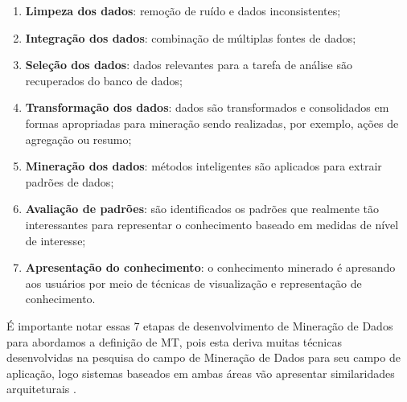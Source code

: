     \begin{enumerate}
        \item \textbf{Limpeza dos dados}: remoção de ruído e dados inconsistentes;
        \item \textbf{Integração dos dados}: combinação de múltiplas fontes de dados;
        \item \textbf{Seleção dos dados}: dados relevantes para a tarefa de análise são recuperados do banco de dados;
        \item \textbf{Transformação dos dados}: dados são transformados e consolidados em formas apropriadas para mineração sendo realizadas, por exemplo, ações de agregação ou resumo;
        \item \textbf{Mineração dos dados}: métodos inteligentes são aplicados para extrair padrões de dados;
        \item \textbf{Avaliação de padrões}: são identificados os padrões que realmente tão interessantes para representar o conhecimento baseado em medidas de nível de interesse;
        \item \textbf{Apresentação do conhecimento}: o conhecimento minerado é apresando aos usuários por meio de técnicas de visualização e representação de conhecimento.
    \end{enumerate}
    
    
    
    É importante notar essas 7 etapas de desenvolvimento de Mineração de Dados para abordamos a definição de MT, pois esta deriva muitas técnicas desenvolvidas na pesquisa do campo de Mineração de Dados para seu campo de aplicação, logo sistemas baseados em ambas áreas vão apresentar similaridades arquiteturais \cite[p.~1]{Feldman:2006:TMH:1076381}. 
    
    
    
